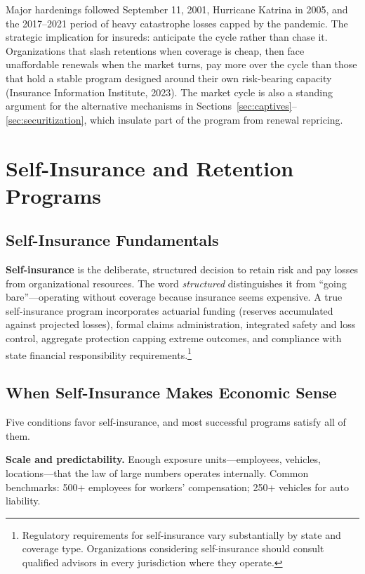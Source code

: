 \documentclass[11pt,openany]{book}
\begin{document}
Major hardenings followed September 11, 2001, Hurricane Katrina in 2005, and
the 2017--2021 period of heavy catastrophe losses capped by the pandemic. The
strategic implication for insureds: anticipate the cycle rather than chase
it. Organizations that slash retentions when coverage is cheap, then face
unaffordable renewals when the market turns, pay more over the cycle than
those that hold a stable program designed around their own risk-bearing
capacity (Insurance Information Institute, 2023). The market cycle is also a
standing argument for the alternative mechanisms in
Sections~\ref{sec:captives}--\ref{sec:securitization}, which insulate part of
the program from renewal repricing.

\section{Self-Insurance and Retention Programs}
\label{sec:self-insurance}

\subsection{Self-Insurance Fundamentals}

\textbf{Self-insurance} is the deliberate, structured decision to retain risk
and pay losses from organizational resources. The word \emph{structured}
distinguishes it from ``going bare''---operating without coverage because
insurance seems expensive. A true self-insurance program incorporates
actuarial funding (reserves accumulated against projected losses), formal
claims administration, integrated safety and loss control, aggregate
protection capping extreme outcomes, and compliance with state financial
responsibility requirements.\footnote{Regulatory requirements for
self-insurance vary substantially by state and coverage type. Organizations
considering self-insurance should consult qualified advisors in every
jurisdiction where they operate.}

\subsection{When Self-Insurance Makes Economic Sense}

Five conditions favor self-insurance, and most successful programs satisfy
all of them.

\textbf{Scale and predictability.} Enough exposure units---employees,
vehicles, locations---that the law of large numbers operates internally.
Common benchmarks: 500+ employees for workers' compensation; 250+ vehicles
for auto liability.
\end{document}

